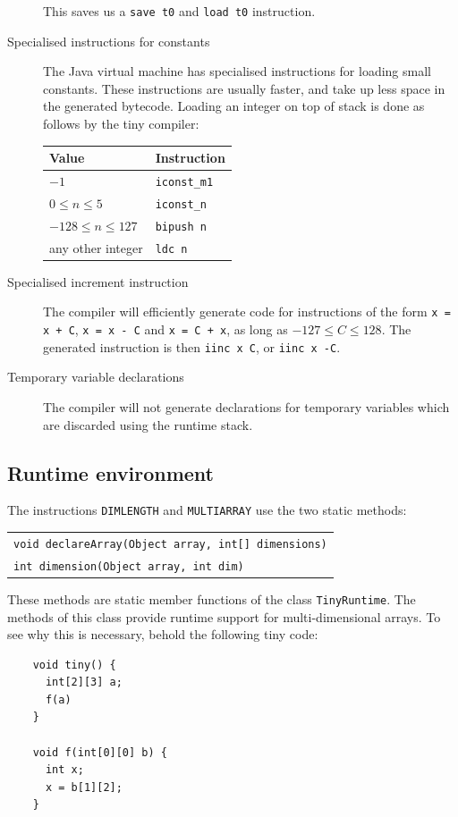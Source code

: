 \documentclass[a4paper]{article}
\begin{document}
\begin{description}
This saves us a \texttt{save t0} and \texttt{load t0} instruction.

\item[Specialised instructions for constants]
The Java virtual machine has specialised instructions for loading small
constants. These instructions are usually faster, and take up less space in
the generated bytecode. Loading an integer on top of stack is done as follows
by the tiny compiler:
\begin{center}
\begin{tabular}{|l|l|}
\hline
Value & Instruction \\
\hline
$-1$ & \texttt{iconst\_m1} \\
$0\leq n \leq 5$ & \texttt{iconst\_n} \\
$-128 \leq n \leq 127$ & \texttt{bipush n} \\
any other integer & \texttt{ldc n} \\
\hline
\end{tabular}
\end{center}
\item[Specialised increment instruction]
The compiler will efficiently generate code for instructions of the form
\texttt{x = x + C}, \texttt{x = x - C} and \texttt{x = C + x}, as long as
$-127 \leq C \leq 128$. The generated instruction is then \texttt{iinc x C},
or \texttt{iinc x -C}.

\item[Temporary variable declarations]
The compiler will not generate declarations for temporary variables which
are discarded using the runtime stack.

\end{description}

\subsection{Runtime environment}
\label{runtime}

The instructions \texttt{DIMLENGTH} and \texttt{MULTIARRAY} use the two static
methods:
\begin{center}
\begin{tabular}{l}
\texttt{void declareArray(Object array, int[] dimensions)}\\
\texttt{int dimension(Object array, int dim)}\\
\end{tabular}
\end{center}

These methods are static member functions of the class \texttt{TinyRuntime}.
The methods of this class provide runtime support for multi-dimensional
arrays. To see why this is necessary, behold the following tiny code:
\begin{verbatim}
    void tiny() {
      int[2][3] a;
      f(a)
    }

    void f(int[0][0] b) {
      int x;
      x = b[1][2];
    }
\end{verbatim}
\end{document}
